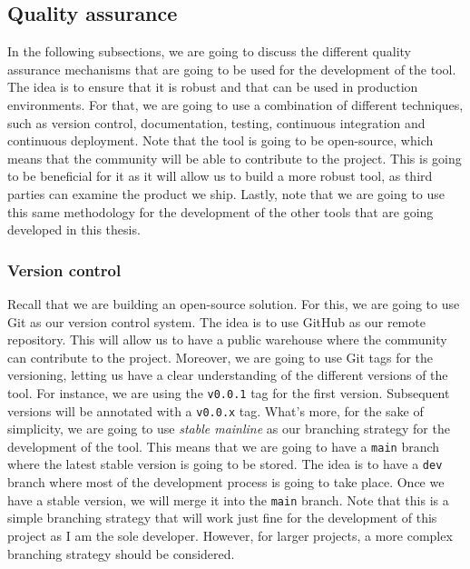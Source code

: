 \begin{code}
    \inputminted{toml}{code/listings/10-5_config}
\end{code}

\subsection{Quality assurance}

In the following subsections, we are going to discuss the different quality assurance mechanisms that are going to be used for the development of the tool. The idea is to ensure that it is robust and that can be used in production environments. For that, we are going to use a combination of different techniques, such as version control, documentation, testing, continuous integration and continuous deployment. Note that the tool is going to be open-source, which means that the community will be able to contribute to the project. This is going to be beneficial for it as it will allow us to build a more robust tool, as third parties can examine the product we ship. Lastly, note that we are going to use this same methodology for the development of the other tools that are going developed in this thesis.

\subsubsection{Version control}

Recall that we are building an open-source solution. For this, we are going to use Git as our version control system. The idea is to use GitHub as our remote repository. This will allow us to have a public warehouse where the community can contribute to the project. Moreover, we are going to use Git tags for the versioning, letting us have a clear understanding of the different versions of the tool. For instance, we are using the \texttt{v0.0.1} tag for the first version. Subsequent versions will be annotated with a \texttt{v0.0.x} tag. What's more, for the sake of simplicity, we are going to use \textit{stable mainline} as our branching strategy for the development of the tool. This means that we are going to have a \texttt{main} branch where the latest stable version is going to be stored. The idea is to have a \texttt{dev} branch where most of the development process is going to take place. Once we have a stable version, we will merge it into the \texttt{main} branch. Note that this is a simple branching strategy that will work just fine for the development of this project as I am the sole developer. However, for larger projects, a more complex branching strategy should be considered.

